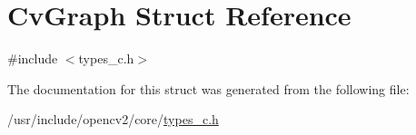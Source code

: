 \hypertarget{structCvGraph}{\section{Cv\-Graph Struct Reference}
\label{structCvGraph}
}


{\ttfamily \#include $<$types\-\_\-c.\-h$>$}



The documentation for this struct was generated from the following file\-:\begin{DoxyCompactItemize}
\item 
/usr/include/opencv2/core/\hyperlink{core_2types__c_8h}{types\-\_\-c.\-h}\end{DoxyCompactItemize}
